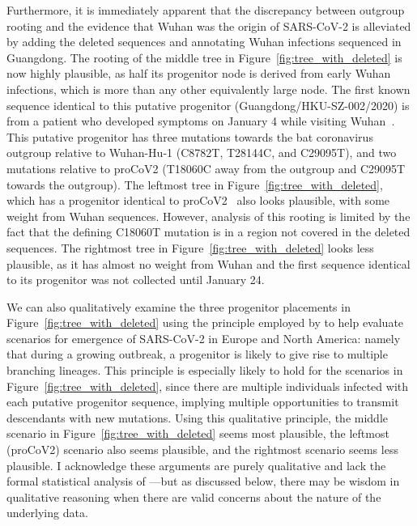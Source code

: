 \documentclass[9pt,twocolumn,twoside]{gsajnl_modified}
\begin{document}
Furthermore, it is immediately apparent that the discrepancy between outgroup rooting and the evidence that Wuhan was the origin of SARS-CoV-2 is alleviated by adding the deleted sequences and annotating Wuhan infections sequenced in Guangdong.
The rooting of the middle tree in Figure~\ref{fig:tree_with_deleted} is now highly plausible, as half its progenitor node is derived from early Wuhan infections, which is more than any other equivalently large node.
The first known sequence identical to this putative progenitor (Guangdong/HKU-SZ-002/2020) is from a patient who developed symptoms on January 4 while visiting Wuhan~\citep{chan2020familial}.
This putative progenitor has three mutations towards the bat coronavirus outgroup relative to Wuhan-Hu-1 (C8782T, T28144C, and C29095T), and two mutations relative to proCoV2 (T18060C away from the outgroup and C29095T towards the outgroup).
The leftmost tree in Figure~\ref{fig:tree_with_deleted}, which has a progenitor identical to proCoV2~\citep{kumar2021evolutionary} also looks plausible, with some weight from Wuhan sequences.
However, analysis of this rooting is limited by the fact that the defining C18060T mutation is in a region not covered in the deleted sequences.
The rightmost tree in Figure~\ref{fig:tree_with_deleted} looks less plausible, as it has almost no weight from Wuhan and the first sequence identical to its progenitor was not collected until January 24.

We can also qualitatively examine the three progenitor placements in Figure~\ref{fig:tree_with_deleted} using the principle employed by \citet{worobey2020emergence} to help evaluate scenarios for emergence of SARS-CoV-2 in Europe and North America: namely that during a growing outbreak, a progenitor is likely to give rise to multiple branching lineages.
This principle is especially likely to hold for the scenarios in Figure~\ref{fig:tree_with_deleted}, since there are multiple individuals infected with each putative progenitor sequence, implying multiple opportunities to transmit descendants with new mutations.
Using this qualitative principle, the middle scenario in Figure~\ref{fig:tree_with_deleted} seems most plausible, the leftmost (proCoV2) scenario also seems plausible, and the rightmost scenario seems less plausible.
I acknowledge these arguments are purely qualitative and lack the formal statistical analysis of \citet{worobey2020emergence}---but as discussed below, there may be wisdom in qualitative reasoning when there are valid concerns about the nature of the underlying data.
\end{document}
